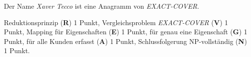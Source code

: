 \begin{diskussion}
Der Name \textsl{Xaver Tecco} ist eine Anagramm von \textsl{EXACT-COVER}.
\end{diskussion}

\begin{bewertung}
Reduktionsprinzip ({\bf R}) 1 Punkt,
Vergleichsproblem \textsl{EXACT-COVER} ({\bf V}) 1 Punkt,
Mapping für Eigenschaften ({\bf E}) 1 Punkt,
für genau eine Eigenschaft ({\bf G}) 1 Punkt,
für alle Kunden erfasst ({\bf A}) 1 Punkt,
Schlussfolgerung NP-vollständig ({\bf N}) 1 Punkt.
\end{bewertung}


